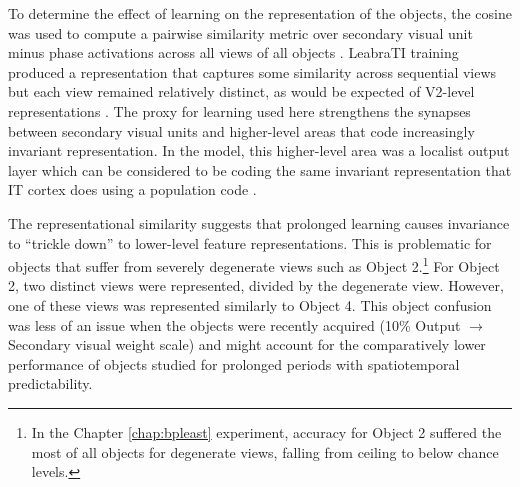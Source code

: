 \documentclass[dwyatte_dissertation.tex]{subfiles}
\begin{document}
To determine the effect of learning on the representation of the objects, the cosine was used to compute a pairwise similarity metric over secondary visual unit minus phase activations across all views of all objects . LeabraTI training produced a representation that captures some similarity across sequential views but each view remained relatively distinct, as would be expected of V2-level representations \cite{KobatakeTanaka94,FreemanSimoncelli11}. The proxy for learning used here strengthens the synapses between secondary visual units and higher-level areas that code increasingly invariant representation. In the model, this higher-level area was a localist output layer which can be considered to be coding the same invariant representation that IT cortex does using a population code \cite{HungKreimanPoggioEtAl05,LiCoxZoccolanEtAl09}. 

The representational similarity suggests that prolonged learning causes invariance to ``trickle down'' to lower-level feature representations. This is problematic for objects that suffer from severely degenerate views such as Object 2.\footnote{In the Chapter \ref{chap:bpleast} experiment, accuracy for Object 2 suffered the most of all objects for degenerate views, falling from ceiling to below chance levels.} For Object 2, two distinct views were represented, divided by the degenerate view. However, one of these views was represented similarly to Object 4. This object confusion was less of an issue when the objects were recently acquired (10\% Output $\rightarrow$ Secondary visual weight scale) and might account for the comparatively lower performance of objects studied for prolonged periods with spatiotemporal predictability.

%
%
\end{document}
